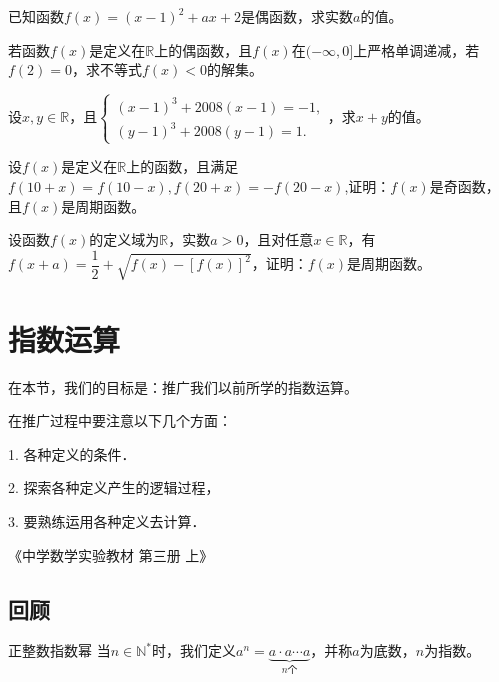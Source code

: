 \documentclass[lang=cn,math=cm,chinesefont=nofont,11pt,scheme=chinese,twocol]{elegantbook}
\begin{document}
\begin{exercise}\label{2017RJB_bx1_P111.B8}
  已知函数$f(x)=(x-1)^2+ax+2$是偶函数，求实数$a$的值。
\end{exercise}

\begin{exercise}\label{2017RJB_bx1_P111.C2}
  若函数$f(x)$是定义在$\mathbb{R}$上的偶函数，且$f(x)$在$(-\infty,0]$上严格单调递减，若$f(2)=0$，求不等式$f(x)<0$的解集。
\end{exercise}

\begin{exercise}\label{ASJC_G1_P30.11}
  设$x,y\in\mathbb{R}$，且$\begin{cases}(x-1)^3+2008(x-1)=-1,\\(y-1)^3+2008(y-1)=1.\end{cases}$，求$x+y$的值。
\end{exercise}

\begin{exercise}\label{HS2FZ_lkb1_P57.3}
  设$f(x)$是定义在$\mathbb{R}$上的函数，且满足$f(10+x)=f(10-x),f(20+x)=-f(20-x)$,证明：$f(x)$是奇函数，且$f(x)$是周期函数。
\end{exercise}

\begin{exercise}\label{HS2FZ_lkb1_P55.2}
  设函数$f(x)$的定义域为$\mathbb{R}$，实数$a>0$，且对任意$x\in\mathbb{R}$，有$f(x+a)=\dfrac{1}{2}+\sqrt{f(x)-[f(x)]^{2}}$，证明：$f(x)$是周期函数。
\end{exercise}

\section{指数运算}

在本节，我们的目标是：推广我们以前所学的指数运算。

\epigraph{在推广过程中要注意以下几个方面：

1. 各种定义的条件．

2. 探索各种定义产生的逻辑过程，

3. 要熟练运用各种定义去计算．}{《中学数学实验教材 第三册 上》}

\subsection{回顾}

\begin{definition}{正整数指数幂}
  当$n\in\mathbb{N}^*$时，我们定义$a^n=\underbrace{a\cdot a\cdots a}_{n\text{个}}$，并称$a$为底数，$n$为指数。
\end{definition}
\end{document}
